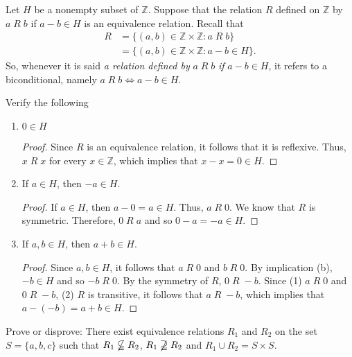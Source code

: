 \documentclass[12pt]{article}
\newcommand{\Z}{\mathbb{Z}}
\newenvironment{problem}[2][Problem]{\begin{trivlist}
		\item[\hskip \labelsep {\bfseries #1}\hskip \labelsep {\bfseries #2.}]}{\end{trivlist}}
\begin{document}
	\begin{problem}{34}
		Let $H$ be a nonempty subset of $\Z$. Suppose that the relation $R$ defined on $\Z$ by $a\; R \;b$ if $a-b \in H$ is an equivalence relation. Recall that 
		\begin{align*}
			R&=\{(a,b)\in \Z\times \Z : a\; R \;b\}\\
			&=\{(a,b)\in \Z\times \Z : a-b \in H\}.
		\end{align*}
		So, whenever it is said \textit{a relation defined by }$a\; R \;b$ \textit{if} $a-b\in H$, it refers to a biconditional, namely $a\; R \; b \iff a-b\in H$.
		
		Verify the following
		\begin{enumerate}[label=(\alph*)]
			\item $0\in H$
			\begin{proof}
				Since $R$ is an equivalence relation, it follows that it is reflexive. Thus, $x\; R \; x$ for every $x\in \Z$, which implies that $x-x=0\in H$.
			\end{proof}
			\item If $a\in H$, then $-a\in H$.
			\begin{proof}
			If $a\in H$, then $a-0=a\in H$. Thus, $a\; R \; 0$. We know that $R$ is symmetric. Therefore, $0\; R \; a$ and so $0-a = -a \in H$.
			\end{proof}
			\item If $a,b\in H$, then $a+b\in H$.
			\begin{proof}
				Since $a,b\in H$, it follows that $a\; R \; 0$ and $b\; R \;0$. By implication (b), $-b \in H$ and so $-b\; R \;0$. By the symmetry of $R$, $0\; R \; -b$. Since (1) $a\; R \; 0$ and $0\; R \; -b$, (2) $R$ is transitive, it follows that $a\; R \; -b$, which implies that $a-(-b) = a+b \in H$. 
			\end{proof}
		\end{enumerate}
	\end{problem}

	\begin{problem}{35}
		Prove or disprove: There exist equivalence relations $R_{1}$ and $R_{2}$ on the set $S=\{a,b,c\}$ such that $R_{1} \nsubseteqq R_{2}$, $R_{1} \nsupseteqq R_{2}$ and $R_{1}\cup R_{2} = S \times S$.
	\end{problem}
\end{document}
